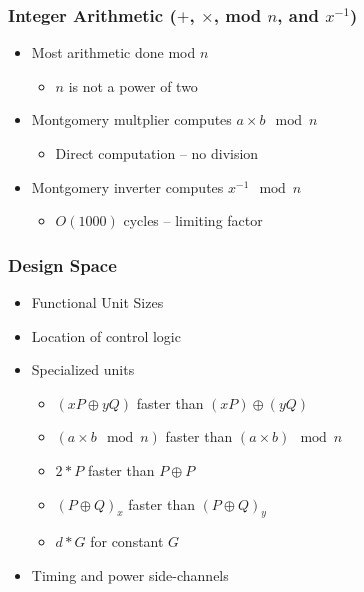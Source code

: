 \documentclass{beamer}
\begin{document}
\begin{frame}
  \frametitle{Integer Arithmetic ($+$, $\times$, mod $n$, and $x^{-1}$)}

  \begin{itemize}
  \item Most arithmetic done mod $n$
    \begin{itemize}
    \item $n$ is not a power of two
    \end{itemize}
  \item Montgomery multplier computes $a\times b\mod n$
    \begin{itemize}
    \item Direct computation -- no division
    \end{itemize}
  \item Montgomery inverter computes $x^{-1}\mod n$
    \begin{itemize}
    \item $O(1000)$ cycles -- limiting factor
    \end{itemize}
  \end{itemize}
\end{frame}

\begin{frame}
  \frametitle{Design Space}

  \begin{itemize}
  \item Functional Unit Sizes
  \item Location of control logic
  \item Specialized units
    \begin{itemize}
    \item $(xP \oplus yQ)$ faster than $(xP) \oplus (yQ)$
    \item $(a \times b \mod n)$ faster than $(a\times b)\mod n$
    \item $2*P$ faster than $P \oplus P$
    \item $(P \oplus Q)_x$ faster than $(P\oplus Q)_y$
    \item $d*G$ for constant $G$
    \end{itemize}
  \item Timing and power side-channels
  \end{itemize}
\end{frame}
\end{document}
